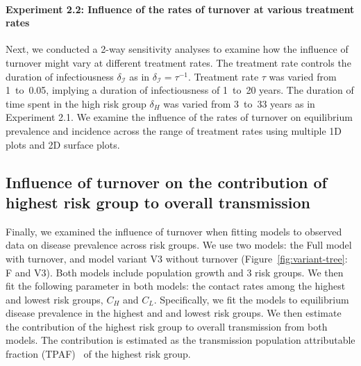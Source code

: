 \paragraph{Experiment 2.2: Influence of the rates of turnover at various treatment rates}
\label{p:exp-2-turnover-2}
Next, we conducted a 2-way sensitivity analyses to examine how
the influence of turnover might vary at different treatment rates.
The treatment rate controls the duration of infectiousness $\delta_{\mathcal{I}}$
as in $\delta_{\mathcal{I}} = \tau^{-1}$.
Treatment rate $\tau$ was varied from 1~to~0.05,
implying a duration of infectiousness of 1~to~20 years.
The duration of time spent in the high risk group $\delta_H$
was varied from 3~to~33 years as in Experiment 2.1.
We examine the influence of the rates of turnover on
equilibrium prevalence and incidence across the
range of treatment rates using multiple 1D plots and 2D surface plots.
\subsection{Influence of turnover on the contribution of highest risk group to overall transmission}
\label{ss:exp-turnover-fit}
Finally, we examined the influence of turnover when fitting models to observed data
on disease prevalence across risk groups.
We use two models: the Full model with turnover, and model variant V3 without turnover
(Figure~\ref{fig:variant-tree}: F and V3).
Both models include population growth and 3 risk groups.
We then fit the following parameter in both models:
the contact rates among the highest and lowest risk groups, $C_H$ and $C_L$.
Specifically, we fit the models to equilibrium disease prevalence
in the highest and and lowest risk groups.
%
We then estimate the contribution of the highest risk group to overall transmission from both models.
The contribution is estimated as
the transmission population attributable fraction (TPAF)~\citep{Mishra2016}
of the highest risk group.

